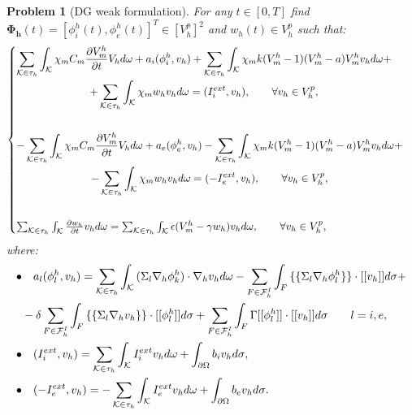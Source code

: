 \documentclass[a4paper,11pt]{article}
\newtheorem{problem}{Problem}
\begin{document}
    \begin{problem}[DG weak formulation]
    For any $t\in[0,T]$ find $\bm{\Phi_h}(t)=[\phi_i^h(t),\phi_e^h(t)]^T \in [V_h^p]^2$  and  $w_h(t) \in V_h^p$ such that:
    \begin{equation*}
    \begin{cases}
    \begin{gathered}
    \sum_{\mathcal{K} \in \tau_h} \int_{\mathcal{K}}{ \chi_m C_m \pdv{V_m^h}{t} V_h d\omega}+a_i(\phi_i^h,v_h)+\sum_{\mathcal{K} \in \tau_h} \int_{\mathcal{K}}{ \chi_m k (V_m^h-1)(V_m^h-a) V_m^h v_h d\omega}+\\
    +\sum_{\mathcal{K} \in \tau_h} \int_{\mathcal{K}}{ \chi_m w_h v_h d\omega}=(I_i^{ext},v_h), \qquad \forall v_h \in V_h^p,\\
    \vspace{2mm}
    \end{gathered}\\
    \begin{gathered}
    -\sum_{\mathcal{K} \in \tau_h} \int_{\mathcal{K}}{ \chi_m C_m \pdv{V_m^h}{t} V_h d\omega}+a_e(\phi_e^h,v_h)-\sum_{\mathcal{K} \in \tau_h} \int_{\mathcal{K}}{ \chi_m k (V_m^h-1)(V_m^h-a) V_m^h v_h d\omega}+\\
    -\sum_{\mathcal{K} \in \tau_h} \int_{\mathcal{K}}{ \chi_m w_h v_h d\omega}=(-I_e^{ext},v_h), \qquad \forall v_h \in V_h^p,\\
       \vspace{2mm}
    \end{gathered}\\
    \sum_{\mathcal{K} \in \tau_h} \int_{\mathcal{K}}{\pdv{w_h}{t}v_h d\omega}=\sum_{\mathcal{K} \in \tau_h} \int_{\mathcal{K}}{\epsilon (V_m^h-\gamma w_h) v_h d\omega}, \qquad \forall v_h \in V_h^p,\\
    \end{cases}
    \end{equation*}
    \vspace{5mm}
    where:
    \vspace{3mm}
    \begin{equation}\label{forgamma}
    \begin{aligned}
    \bullet& \quad a_l(\phi_l^h,v_h)=\sum_{\mathcal{K} \in \tau_h} \int_{\mathcal{K}}{(\Sigma_l \nabla_h \phi_k^h) \cdot \nabla_h v_h d\omega}-\sum_{F \in \mathcal{F}_h^I} \int_F { \{\{\Sigma_l \nabla_h \phi_l^h \}\} \cdot [[v_h]] d\sigma}+\\
    &-\delta \sum_{F \in \mathcal{F}_h^I} \int_F{ \{\{\Sigma_l \nabla_h v_h\}\} \cdot [[\phi_l^h]]d\sigma}+\sum_{F \in \mathcal{F}_h^I}\int_F {\Gamma [[\phi_l^h]] \cdot [[v_h]] d\sigma} \qquad l=i,e,\\
    \newline
    \bullet& \quad (I_i^{ext},v_h)=\sum_{\mathcal{K} \in \tau_h} \int_{\mathcal{K}} {I_i^{ext} v_h d\omega}+\int_{\partial \Omega}{b_i v_h d\sigma},\\
    \newline
    \bullet& \quad (-I_e^{ext},v_h)=-\sum_{\mathcal{K} \in \tau_h} \int_{\mathcal{K}} {I_e^{ext} v_h d\omega}+\int_{\partial \Omega}{b_e v_h d\sigma}.
    \end{aligned}
    \end{equation}
    

\end{problem}
\end{document}
